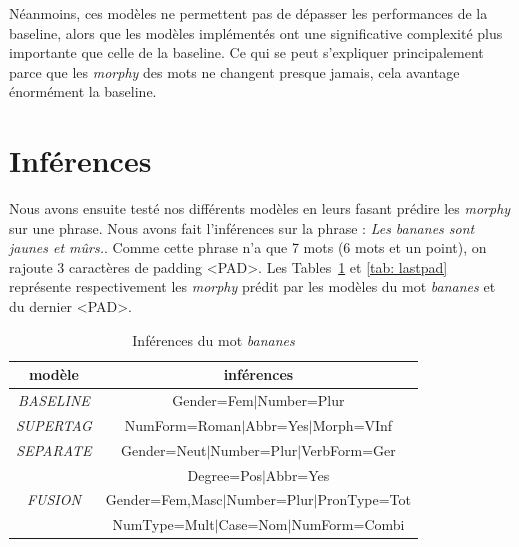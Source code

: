 \documentclass[a4paper]{article}
\begin{document}
Néanmoins, ces modèles ne permettent pas de dépasser les performances de la baseline, alors que les modèles implémentés ont une
significative complexité plus importante que celle de la baseline.
Ce qui se peut s'expliquer principalement parce que les \textit{morphy} des mots ne changent presque jamais, cela avantage 
énormément la baseline.

\section{Inférences}

Nous avons ensuite testé nos différents modèles en leurs fasant prédire les \textit{morphy} sur une phrase. Nous avons fait
l'inférences sur la phrase : \textit{Les bananes sont jaunes et mûrs.}. Comme cette phrase n'a que 7 mots (6 mots et un point),
on rajoute 3 caractères de padding <PAD>. Les Tables~\ref{tab: bananes} et \ref{tab: lastpad} représente respectivement les
\textit{morphy} prédit par les modèles du mot \textit{bananes} et du dernier <PAD>.
\begin{table}[H]
    \centering
    \begin{tabular}{|c|c|}
        \hline
        \textbf{modèle} & \textbf{inférences} \\
        \hline
        \textit{BASELINE} & Gender=Fem$\mid$Number=Plur \\
        \hline
        \textit{SUPERTAG} & NumForm=Roman$\mid$Abbr=Yes$\mid$Morph=VInf\\
        \hline
        \textit{SEPARATE} & Gender=Neut$\mid$Number=Plur$\mid$VerbForm=Ger\\
            & Degree=Pos$\mid$Abbr=Yes\\
        \hline
        \textit{FUSION} & Gender=Fem,Masc$\mid$Number=Plur$\mid$PronType=Tot\\
            & NumType=Mult$\mid$Case=Nom$\mid$NumForm=Combi\\
        \hline
    \end{tabular}
    \caption{Inférences du mot \textit{bananes}}
    \label{tab: bananes}
\end{table}
\end{document}
